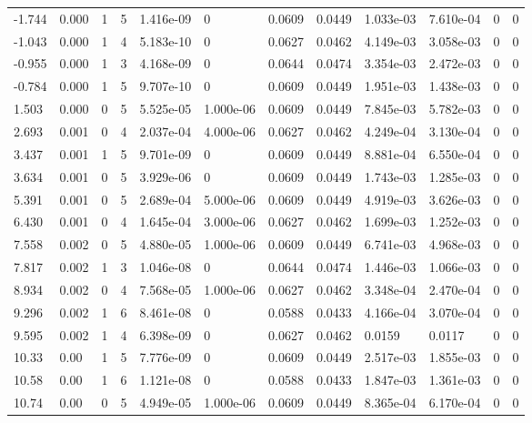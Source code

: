 \documentclass[preview]{standalone}
\begin{document}
{{\begin{tabular}{L{1.2cm}C{1.2cm} C{0.3cm}C{0.5cm} C{1.4cm}C{1.4cm} C{1.4cm}C{1.4cm} C{1.6cm}C{1.6cm} C{1.6cm}C{1.6cm}}
  -1.744  &  0.000  & 1     &  5 &  1.416e-09  & 0  &  0.0609&   0.0449& 1.033e-03 & 7.610e-04   &  0 & 0  \\ 
  -1.043  &  0.000  & 1     &  4 &  5.183e-10  & 0  &  0.0627&   0.0462& 4.149e-03 & 3.058e-03   &  0 & 0  \\ 
  -0.955  &  0.000  & 1     &  3 &  4.168e-09  & 0  &  0.0644&   0.0474& 3.354e-03 & 2.472e-03   &  0 & 0  \\ 
  -0.784  &  0.000  & 1     &  5 &  9.707e-10  & 0  &  0.0609&   0.0449& 1.951e-03 & 1.438e-03   &  0 & 0  \\ 
  1.503  &  0.000  & 0     &  5 &  5.525e-05  & 1.000e-06  &  0.0609&   0.0449& 7.845e-03 & 5.782e-03   &  0 & 0  \\ 
  2.693  &  0.001  & 0     &  4 &  2.037e-04  & 4.000e-06  &  0.0627&   0.0462& 4.249e-04 & 3.130e-04   &  0 & 0  \\ 
  3.437  &  0.001  & 1     &  5 &  9.701e-09  & 0  &  0.0609&   0.0449& 8.881e-04 & 6.550e-04   &  0 & 0  \\ 
  3.634  &  0.001  & 0     &  5 &  3.929e-06  & 0  &  0.0609&   0.0449& 1.743e-03 & 1.285e-03   &  0 & 0  \\ 
  5.391  &  0.001  & 0     &  5 &  2.689e-04  & 5.000e-06  &  0.0609&   0.0449& 4.919e-03 & 3.626e-03   &  0 & 0  \\ 
  6.430  &  0.001  & 0     &  4 &  1.645e-04  & 3.000e-06  &  0.0627&   0.0462& 1.699e-03 & 1.252e-03   &  0 & 0  \\ 
  7.558  &  0.002  & 0     &  5 &  4.880e-05  & 1.000e-06  &  0.0609&   0.0449& 6.741e-03 & 4.968e-03   &  0 & 0  \\ 
  7.817  &  0.002  & 1     &  3 &  1.046e-08  & 0  &  0.0644&   0.0474& 1.446e-03 & 1.066e-03   &  0 & 0  \\ 
  8.934  &  0.002  & 0     &  4 &  7.568e-05  & 1.000e-06  &  0.0627&   0.0462& 3.348e-04 & 2.470e-04   &  0 & 0  \\ 
  9.296  &  0.002  & 1     &  6 &  8.461e-08  & 0  &  0.0588&   0.0433& 4.166e-04 & 3.070e-04   &  0 & 0  \\ 
  9.595  &  0.002  & 1     &  4 &  6.398e-09  & 0  &  0.0627&   0.0462& 0.0159 & 0.0117   &  0 & 0  \\ 
  10.33  &  0.00  & 1     &  5 &  7.776e-09  & 0  &  0.0609&   0.0449& 2.517e-03 & 1.855e-03   &  0 & 0  \\ 
  10.58  &  0.00  & 1     &  6 &  1.121e-08  & 0  &  0.0588&   0.0433& 1.847e-03 & 1.361e-03   &  0 & 0  \\ 
  10.74  &  0.00  & 0     &  5 &  4.949e-05  & 1.000e-06  &  0.0609&   0.0449& 8.365e-04 & 6.170e-04   &  0 & 0  \\ 

\end{tabular}}}
\end{document}
